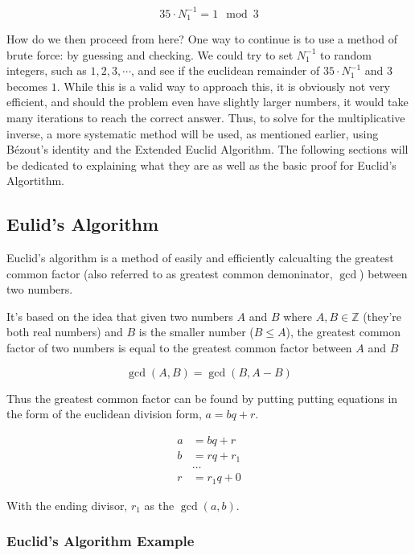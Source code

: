 \documentclass[index]{subfiles}
\begin{document}
\begin{equation*}
    35\cdot N_1^{-1}=1\mod 3
\end{equation*}

How do we then proceed from here? One way to continue is to use a method of brute force: by guessing and checking. We could try to set \(N_1^{-1}\) to random integers, such as \(1, 2, 3,\cdots\), and see if the euclidean remainder of \(35\cdot N_1^{-1}\) and \(3\) becomes \(1\). While this is a valid way to approach this, it is obviously not very efficient, and should the problem even have slightly larger numbers, it would take many iterations to reach the correct answer. Thus, to solve for the multiplicative inverse, a more systematic method will be used, as mentioned earlier, using Bézout's identity and the Extended Euclid Algorithm. The following sections will be dedicated to explaining what they are as well as the basic proof for Euclid's Algortithm.

\subsection{Eulid's Algorithm}

Euclid's algorithm is a method of easily and efficiently calcualting the greatest common factor (also referred to as greatest common demoninator, \(\gcd\)) between two numbers.

It's based on the idea that given two numbers \(A\) and \(B\) where \(A, B \in \mathbb{Z}\) (they're both real numbers) and \(B\) is the smaller number (\(B\leq A\)), the greatest common factor of two numbers is equal to the greatest common factor between \(A\) and \(B\)

\[\gcd(A,B)=\gcd(B, A-B)\]

Thus the greatest common factor can be found by putting putting equations in the form of the euclidean division form, \(a=bq+r\).

\begin{align*}
    a & =bq+r   \\
    b & =rq+r_1 \\
      & \ldots  \\
    r & =r_1q+0
\end{align*}

With the ending divisor, \(r_1\) as the \(\gcd(a, b)\).

\subsubsection{Euclid's Algorithm Example}
\end{document}

